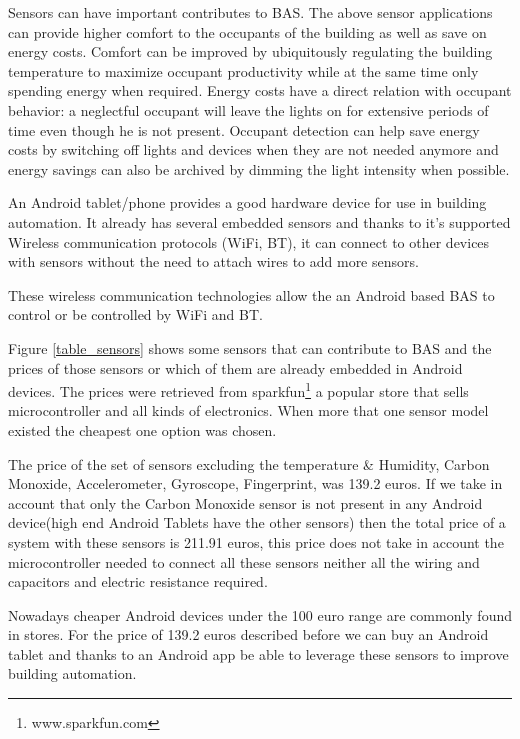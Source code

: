 Sensors can have important contributes to \ac{BAS}. The above sensor applications can provide higher comfort to the occupants of the building as well as save on energy costs. Comfort can be improved by ubiquitously regulating the building temperature to maximize occupant productivity while at the same time only spending energy when required. Energy costs have a direct relation with occupant behavior: a neglectful occupant will leave the lights on for extensive periods of time even though he is not present. Occupant detection can help save energy costs by switching off lights and devices when they are not needed anymore and energy savings can also be archived by dimming the light intensity when possible. 

An Android tablet/phone provides a good hardware device for use in building automation. It already has several embedded sensors  and thanks to it's supported Wireless communication protocols (\ac{WiFi}, \ac{BT}), it can connect to other devices with sensors without the need to attach wires to add more sensors. 

These wireless communication technologies allow the an Android based BAS to control or be controlled by \ac{WiFi} and \ac{BT}.

Figure \ref{table_sensors} shows some sensors that can contribute to BAS and the prices of those sensors or which of them are already embedded in Android devices. The prices were retrieved from sparkfun\footnote{www.sparkfun.com} a popular store that sells microcontroller and all kinds of electronics. When more that one sensor model existed the cheapest one option was chosen.

The price of the  set of sensors excluding the temperature \& Humidity, Carbon Monoxide, Accelerometer, Gyroscope, Fingerprint, was 139.2 euros. If we take in account that only the Carbon Monoxide sensor is not present in any Android device(high end Android Tablets have the other sensors) then the total price of a system with these sensors is 211.91 euros, this price does not take in account the microcontroller needed to connect all these sensors neither all the wiring and capacitors and electric resistance required.

Nowadays cheaper Android devices under the 100 euro range are commonly found in stores. For the price of 139.2 euros described before we can buy an Android tablet and thanks to an Android app be able to leverage these sensors to improve building automation.

